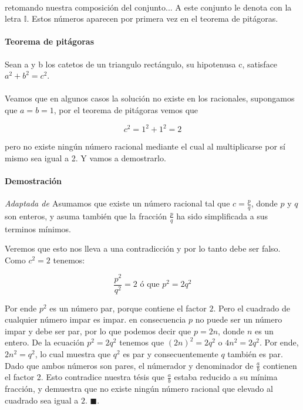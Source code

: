 \documentclass{article}
\begin{document}
\paragraph{} retomando nuestra composición del conjunto... A este conjunto le denota con la letra $\mathbb{I}$. Estos números aparecen por primera vez en el teorema de pitágoras.

\paragraph{Teorema de pitágoras} Sean a y b los catetos de un triangulo rectángulo, su hipotenusa c, satisface $a^2 + b^2 = c^2$.

\paragraph{} Veamos que en algunos casos la solución no existe en los racionales, supongamos que $a = b = 1$, por el teorema de pitágoras vemos que

$$c^2 = 1^2 + 1^2 = 2$$

pero no existe ningún número racional mediante el cual al multiplicarse por sí mismo sea igual a 2. Y vamos a demostrarlo.

\paragraph{Demostración} \textit{Adaptada de \cite{brink_1933}} Asumamos que existe un número racional tal que $c = \frac{p}{q}$, donde $p$ y $q$ son enteros, y asuma también que la fracción $\frac{p}{q}$ ha sido simplificada a sus terminos mínimos.

Veremos que esto nos lleva a una contradicción y por lo tanto debe ser falso. Como $c^2 = 2$ tenemos:

$$\frac{p^2}{q^2} = 2 \text{ ó que } p^2 = 2q^2$$

Por ende $p^2$ es un número par, porque contiene el factor $2$. Pero el cuadrado de cualquier número impar es impar. en consecuencia $p$ no puede ser un número impar y debe ser par, por lo que podemos decir que $p = 2n$, donde $n$ es un entero. De la ecuación $p^2 = 2q^2$ tenemos que $(2n)^2 = 2q^2$ o $4n^2 = 2q^2$. Por ende, $2n^2 = q^2$, lo cual muestra que $q^2$ es par y consecuentemente $q$ también es par. Dado que ambos números son pares, el númerador y denominador de $\frac{a}{b}$ contienen el factor 2. Esto contradice nuestra tésis que $\frac{a}{b}$ estaba reducido a su mínima fracción, y demuestra que no existe ningún número racional que elevado al cuadrado sea igual a $2$. $\blacksquare$.
\end{document}
